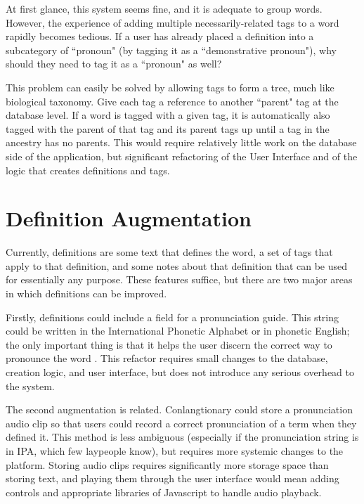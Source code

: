 At first glance, this system seems fine, and it is adequate to group words. However, the experience of adding multiple necessarily-related tags to a word rapidly becomes tedious. If a user has already placed a definition into a subcategory of ``pronoun" (by tagging it as a ``demonstrative pronoun"), why should they need to tag it as a ``pronoun" as well?

This problem can easily be solved by allowing tags to form a tree, much like biological taxonomy. Give each tag a reference to another ``parent" tag at the database level. If a word is tagged with a given tag, it is automatically also tagged with the parent of that tag and its parent tags up until a tag in the ancestry has no parents. This would require relatively little work on the database side of the application, but significant refactoring of the User Interface and of the logic that creates definitions and tags.

\section{Definition Augmentation}
\label{sec:refactor-definitions}

Currently, definitions are some text that defines the word, a set of tags that apply to that definition, and some notes about that definition that can be used for essentially any purpose. These features suffice, but there are two major areas in which definitions can be improved.

Firstly, definitions could include a field for a pronunciation guide. This string could be written in the International Phonetic Alphabet or in phonetic English; the only important thing is that it helps the user discern the correct way to pronounce the word \cite{IPA}. This refactor requires small changes to the database, creation logic, and user interface, but does not introduce any serious overhead to the system.

The second augmentation is related. Conlangtionary could store a pronunciation audio clip so that users could record a correct pronunciation of a term when they defined it. This method is less ambiguous (especially if the pronunciation string is in IPA, which few laypeople know), but requires more systemic changes to the platform. Storing audio clips requires significantly more storage space than storing text, and playing them through the user interface would mean adding controls and appropriate libraries of Javascript to handle audio playback.


